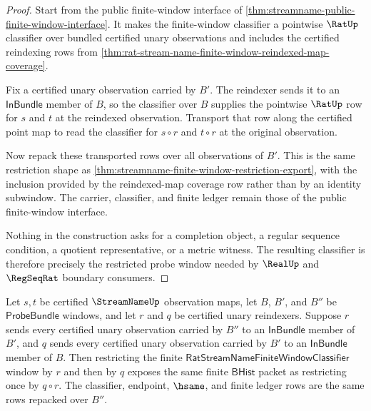 \begin{proof}
Start from the public finite-window interface of
\autoref{thm:streamname-public-finite-window-interface}. It makes the
finite-window classifier a pointwise $\RatUp$ classifier over bundled certified
unary observations and includes the certified reindexing rows from
\autoref{thm:rat-stream-name-finite-window-reindexed-map-coverage}.

Fix a certified unary observation carried by $B'$. The reindexer sends it to an
$\mathsf{InBundle}$ member of $B$, so the classifier over $B$ supplies the
pointwise $\RatUp$ row for $s$ and $t$ at the reindexed observation. Transport
that row along the certified point map to read the classifier for $s\circ r$ and
$t\circ r$ at the original observation.

Now repack these transported rows over all observations of $B'$. This is the
same restriction shape as
\autoref{thm:streamname-finite-window-restriction-export}, with the inclusion
provided by the reindexed-map coverage row rather than by an identity
subwindow. The carrier, classifier, and finite ledger remain those of the
public finite-window interface.

Nothing in the construction asks for a completion object, a regular sequence
condition, a quotient representative, or a metric witness. The resulting
classifier is therefore precisely the restricted probe window needed by
$\RealUp$ and $\RegSeqRat$ boundary consumers.
\end{proof}

\begin{theorem}
\label{thm:streamname-finite-window-reindexing-composition}
Let $s,t$ be certified $\StreamNameUp$ observation maps, let $B$, $B'$, and
$B''$ be $\mathsf{ProbeBundle}$ windows, and let $r$ and $q$ be certified unary
reindexers. Suppose $r$ sends every certified unary observation carried by
$B''$ to an $\mathsf{InBundle}$ member of $B'$, and $q$ sends every certified
unary observation carried by $B'$ to an $\mathsf{InBundle}$ member of $B$.
Then restricting the finite $\mathsf{RatStreamNameFiniteWindowClassifier}$
window by $r$ and then by $q$ exposes the same finite $\mathsf{BHist}$ packet as
restricting once by $q\circ r$. The classifier, endpoint, $\hsame$, and finite
ledger rows are the same rows repacked over $B''$.
\end{theorem}

